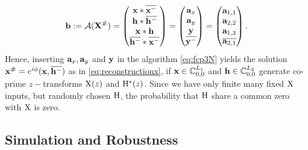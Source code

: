 \documentclass[conference]{IEEEtran}
\begin{document}
\begin{align}
  {\ensuremath{\mathbf b}}:=  {\mathcal{A}}({\mathbf X}^{\#})=\begin{pmatrix} 
   {\ensuremath{\mathbf x}}*{\overline{{\mathbf x^{-}}}} \\ 
   {\mathbf h}*{\overline{{\mathbf h}^-}}\\
   {\mathbf x}*{\mathbf h} \\
 {\overline{{\mathbf h}^-}}*{\overline{{\mathbf x^{-}}}}
 \end{pmatrix}
 =\begin{pmatrix}{\ensuremath{\mathbf a}}_{x}\\{\mathbf a}_{y}\\{\mathbf y}\\{\overline{{\mathbf y}^-}}\end{pmatrix}
 =\begin{pmatrix}{\ensuremath{\mathbf a}}_{1,1}\\{\mathbf a}_{2,2}\\{\mathbf a}_{1,2}\\{\overline{{\mathbf a}_{2,1}}}\end{pmatrix}.
\end{align}
%
Hence, inserting ${\mathbf a}_x,{\mathbf a}_y$ and ${\mathbf y}$ in the algorithm \eqref{eq:fcp3N} yields the solution ${\mathbf x}^{\#}=e^{i\phi} ({\mathbf x},
{\overline{{\mathbf h}^-}})$ as in \eqref{eq:reconstructionx}, if ${\mathbf x} \in{\ensuremath{\mathbb C}}_{0,0}^{L_1}$ and ${\mathbf h}
\in{\ensuremath{\mathbb C}}_{0,0}^{L_2}$ generate co-prime $z-$transforms ${\mathrm X}(z)$ and ${\mathrm H}^*(z)$. Since we have only finite many fixed ${\mathrm X}$
inputs, but randomly chosen ${\mathrm H}$, the probability that ${\mathrm H}$ share a common zero with ${\mathrm X}$ is zero.  




\subsection{Simulation and Robustness} \label{sec:simulation}
\end{document}
